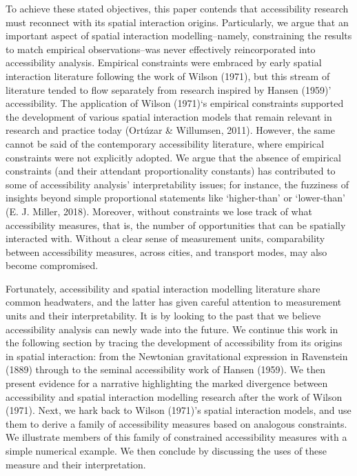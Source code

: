 \documentclass[
11pt, %
oneside, %
english, %
singlespacing, %
]{macthesis} %
\begin{document}
To achieve these stated objectives, this paper contends that accessibility research must reconnect with its spatial interaction origins. Particularly, we argue that an important aspect of spatial interaction modelling--namely, constraining the results to match empirical observations--was never effectively reincorporated into accessibility analysis. Empirical constraints were embraced by early spatial interaction literature following the work of Wilson (1971), but this stream of literature tended to flow separately from research inspired by Hansen (1959)' accessibility. The application of Wilson (1971)`s empirical constraints supported the development of various spatial interaction models that remain relevant in research and practice today (Ortúzar \& Willumsen, 2011). However, the same cannot be said of the contemporary accessibility literature, where empirical constraints were not explicitly adopted. We argue that the absence of empirical constraints (and their attendant proportionality constants) has contributed to some of accessibility analysis' interpretability issues; for instance, the fuzziness of insights beyond simple proportional statements like `higher-than' or `lower-than' (E. J. Miller, 2018). Moreover, without constraints we lose track of what accessibility measures, that is, the number of opportunities that can be spatially interacted with. Without a clear sense of measurement units, comparability between accessibility measures, across cities, and transport modes, may also become compromised.

Fortunately, accessibility and spatial interaction modelling literature share common headwaters, and the latter has given careful attention to measurement units and their interpretability. It is by looking to the past that we believe accessibility analysis can newly wade into the future. We continue this work in the following section by tracing the development of accessibility from its origins in spatial interaction: from the Newtonian gravitational expression in Ravenstein (1889) through to the seminal accessibility work of Hansen (1959). We then present evidence for a narrative highlighting the marked divergence between accessibility and spatial interaction modelling research after the work of Wilson (1971). Next, we hark back to Wilson (1971)'s spatial interaction models, and use them to derive a family of accessibility measures based on analogous constraints. We illustrate members of this family of constrained accessibility measures with a simple numerical example. We then conclude by discussing the uses of these measure and their interpretation.
\end{document}

